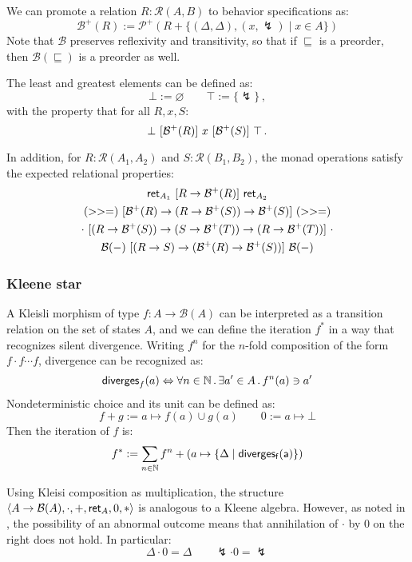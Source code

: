 We can promote a relation $R : \mathcal{R}(A, B)$
to behavior specifications as:
\[ \mathcal{B}^+(R) :=
   \mathcal{P}^+(R + \{ (\Delta, \Delta), (x, \lightning) \mid x \in A \}) \]
Note that $\mathcal{B}$ preserves reflexivity and transitivity,
so that if $\sqsubseteq$ is a preorder,
then $\mathcal{B}(\sqsubseteq)$ is a preorder as well.

The least and greatest elements
can be defined as:
\[ \bot := \varnothing \qquad \top := \{ \lightning \} \,, \]
with the property that for all $R, x, S$:
\[ \bot \ [{\mathcal{B}^+(R)}]\  x \ [{\mathcal{B}^+(S)}]\  \top \,. \]

In addition,
for $R : \mathcal{R}(A_1, A_2)$ and $S : \mathcal{R}(B_1, B_2)$,
the monad operations satisfy the expected relational properties:
\begin{gather*}
 \mathsf{ret} _{A_1} \ [{R \rightarrow \mathcal{B}^+(R)}]\   \mathsf{ret} _{A_2} \\
({>>=}) \ [{\mathcal{B}^+(R) \rightarrow (R \rightarrow \mathcal{B}^+(S))
  \rightarrow \mathcal{B}^+(S)}]\  ({>>=}) \\
{\cdot} \ [{(R \rightarrow \mathcal{B}^+(S)) \rightarrow
             (S \rightarrow \mathcal{B}^+(T)) \rightarrow
             (R \rightarrow \mathcal{B}^+(T))}]\  {\cdot} \\
\mathcal{B}(-) \ [{(R \rightarrow S) \rightarrow (\mathcal{B}^+(R)
\rightarrow \mathcal{B}^+(S))}]\  \mathcal{B}(-)
\end{gather*}

\subsubsection{Kleene star}

A Kleisli morphism of type $f : A \rightarrow \mathcal{B}(A)$
can be interpreted as a transition relation on the set of states $A$,
and we can define the iteration $f^*$
in a way that recognizes silent divergence.
Writing $f^n$ for the $n$-fold composition of the form
$f \cdot f \cdots f$,
divergence can be recognized as:
\[  \mathsf{diverges} _f(a) \Leftrightarrow
    \forall n \in \mathbb{N} \,.\,
    \exists a' \in A \,.\,
    f^n(a) \ni a' \]
Nondeterministic choice
and its unit can be defined as:
\[ f + g := a \mapsto f(a) \cup g(a)  \qquad  0 := a \mapsto \bot \]
Then the iteration of $f$ is:
\[ f^* := \sum_{n \in \mathbb{N}} f^n +
          (a \mapsto \{ \Delta \mid  \mathsf{diverges_f(a)}  \}) \]

Using Kleisi composition as multiplication,
the structure
$\langle A \rightarrow \mathcal{B}(A), {\cdot}, {+},  \mathsf{ret} _A, 0, * \rangle$
is analogous to a Kleene algebra.
However, as noted in \cite{failkat},
the possibility of an abnormal outcome
means that annihilation of $\cdot$ by $0$ on the right
does not hold.
In particular:
\[ \Delta \cdot 0 = \Delta \qquad \lightning \cdot 0 = \lightning \]

